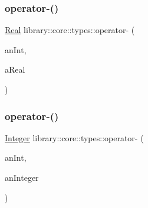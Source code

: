 \subsubsection{\texorpdfstring{operator-\/()}{operator-()}\hspace{0.1cm}{\footnotesize\ttfamily [1/2]}}
{\footnotesize\ttfamily \mbox{\hyperlink{classlibrary_1_1core_1_1types_1_1_real}{Real}} library\+::core\+::types\+::operator-\/ (\begin{DoxyParamCaption}\item[{const \mbox{\hyperlink{classlibrary_1_1core_1_1types_1_1_real_a9c5c8826b7e5a8e39544d23fea6c0e1c}{Real\+::\+Value\+Type}} \&}]{an\+Int,  }\item[{const \mbox{\hyperlink{classlibrary_1_1core_1_1types_1_1_real}{Real}} \&}]{a\+Real }\end{DoxyParamCaption})}

\mbox{\label{namespacelibrary_1_1core_1_1types_a6babebcdc3f674f593eb5e1b93b78523}} 
\subsubsection{\texorpdfstring{operator-\/()}{operator-()}\hspace{0.1cm}{\footnotesize\ttfamily [2/2]}}
{\footnotesize\ttfamily \mbox{\hyperlink{classlibrary_1_1core_1_1types_1_1_integer}{Integer}} library\+::core\+::types\+::operator-\/ (\begin{DoxyParamCaption}\item[{const \mbox{\hyperlink{classlibrary_1_1core_1_1types_1_1_integer_a623afb1580f870fd8a1997b1c12c917d}{Integer\+::\+Value\+Type}} \&}]{an\+Int,  }\item[{const \mbox{\hyperlink{classlibrary_1_1core_1_1types_1_1_integer}{Integer}} \&}]{an\+Integer }\end{DoxyParamCaption})}

\mbox{\label{namespacelibrary_1_1core_1_1types_a658c106fe2c6306de5469a586c287bc2}} 
